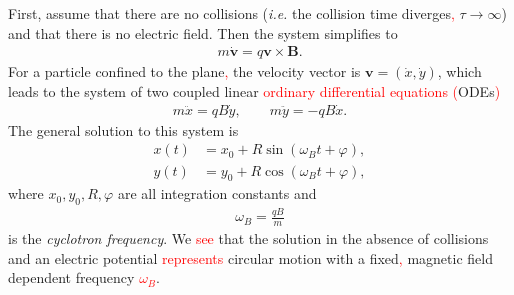         \indent First, assume that there are no collisions (\textit{i.e.} the collision time diverges\textcolor{red}{,} $\tau \rightarrow\infty$) and that there is no electric field. Then the system simplifies to
        \begin{align}
            m\dot{\bm{v}} =q \bm{v}\times \bm{B}.
        \end{align}
        For a particle confined to the plane\textcolor{red}{,} the velocity vector is $\bm{v} = (\dot{x}, \dot{y})$, which leads to the system of two coupled linear \textcolor{red}{ordinary differential equations (}ODEs\textcolor{red}{)}
        \begin{align}
            m \ddot{x} = q B \dot{y}, \qquad m \ddot{y}= -q B \dot{x}.
        \end{align}
        The general solution to this system is
        \begin{align}
            x(t) &= x_0 + R \sin\left(\omega_Bt + \varphi \right), \\
            y(t) &= y_0 + R \cos\left(\omega_Bt + \varphi \right),
        \end{align}
        where $x_0, y_0, R, \varphi$ are all integration constants and
        \begin{align}
            \omega_B = \frac{q B}{m}
        \end{align}
        is the \textit{cyclotron frequency}.
        We \textcolor{red}{see} that the solution in the absence of collisions and an electric potential \textcolor{red}{represents} circular motion with a fixed\textcolor{red}{,} magnetic field dependent frequency \textcolor{red}{$\omega_B$}.

